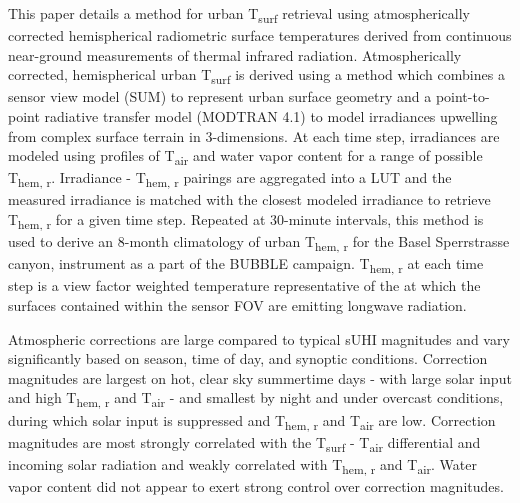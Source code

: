 This paper details a  method for urban T\textsubscript{surf} retrieval using atmospherically corrected hemispherical radiometric surface temperatures derived from continuous near-ground measurements of thermal infrared radiation. Atmospherically corrected, hemispherical urban T\textsubscript{surf} is derived using a method which combines a sensor view model (SUM) to represent urban surface geometry and a point-to-point radiative transfer model (MODTRAN 4.1) to model irradiances upwelling from complex surface terrain in 3-dimensions. At each time step, irradiances are modeled using profiles of T\textsubscript{air} and water vapor content for a range of possible T\textsubscript{hem, r}. Irradiance - T\textsubscript{hem, r} pairings are aggregated into a LUT and the measured irradiance is matched with the closest modeled irradiance to retrieve T\textsubscript{hem, r} for a given time step. Repeated at 30-minute intervals, this method is used to derive an 8-month climatology of urban T\textsubscript{hem, r} for the Basel Sperrstrasse canyon, instrument as a part of the BUBBLE campaign. T\textsubscript{hem, r} at each time step is a view factor weighted temperature representative of the  at which the surfaces contained within the sensor FOV are emitting longwave radiation.
 
Atmospheric corrections are large compared to typical sUHI magnitudes \cite{Peng2012} and vary significantly based on season, time of day, and synoptic conditions. Correction magnitudes are largest on hot, clear sky summertime days - with large solar input and high T\textsubscript{hem, r} and T\textsubscript{air} - and smallest by night and under overcast conditions, during which solar input is suppressed and T\textsubscript{hem, r} and T\textsubscript{air} are low. Correction magnitudes are most strongly correlated with the T\textsubscript{surf} - T\textsubscript{air} differential and incoming solar radiation and weakly correlated with T\textsubscript{hem, r} and T\textsubscript{air}. Water vapor content did not appear to exert strong control over correction magnitudes.

